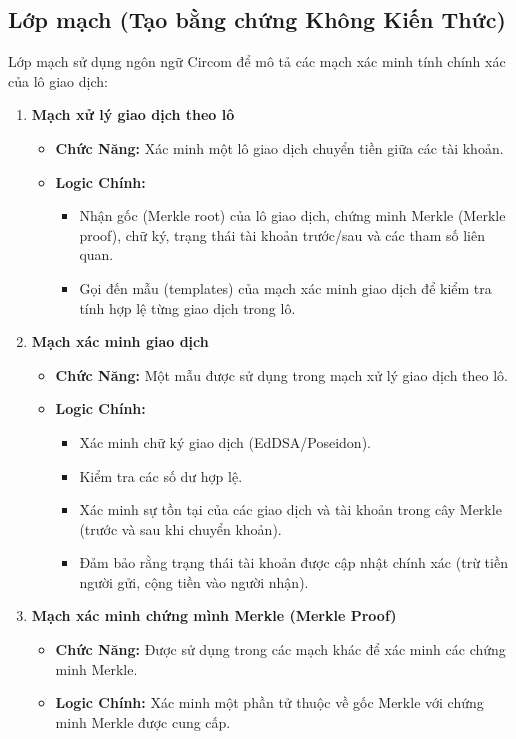 \subsection{Lớp mạch (Tạo bằng chứng Không Kiến Thức)}
Lớp mạch sử dụng ngôn ngữ Circom để mô tả các mạch xác minh tính chính xác của lô giao dịch:
\begin{enumerate}

\item \textbf{Mạch xử lý giao dịch theo lô}
\begin{itemize}
    \item \textbf{Chức Năng:} Xác minh một lô giao dịch chuyển tiền giữa các tài khoản.
    \item \textbf{Logic Chính:}
    \begin{itemize}
        \item Nhận gốc (Merkle root) của lô giao dịch, chứng minh Merkle (Merkle proof), chữ ký, trạng thái tài khoản trước/sau và các tham số liên quan.
        \item Gọi đến mẫu (templates) của mạch xác minh giao dịch để kiểm tra tính hợp lệ từng giao dịch trong lô.
    \end{itemize}
\end{itemize}

\item \textbf{Mạch xác minh giao dịch}
\begin{itemize}
    \item \textbf{Chức Năng:} Một mẫu được sử dụng trong mạch xử lý giao dịch theo lô.
    \item \textbf{Logic Chính:}
    \begin{itemize}
        \item Xác minh chữ ký giao dịch (EdDSA/Poseidon).
        \item Kiểm tra các số dư hợp lệ.
        \item Xác minh sự tồn tại của các giao dịch và tài khoản trong cây Merkle (trước và sau khi chuyển khoản).
        \item Đảm bảo rằng trạng thái tài khoản được cập nhật chính xác (trừ tiền người gửi, cộng tiền vào người nhận).
    \end{itemize}
\end{itemize}

\item \textbf{Mạch xác minh chứng mình Merkle (Merkle Proof)}
\begin{itemize}
    \item \textbf{Chức Năng:} Được sử dụng trong các mạch khác để xác minh các chứng minh Merkle.
    \item \textbf{Logic Chính:} Xác minh một phần tử thuộc về gốc Merkle với chứng minh Merkle được cung cấp.
\end{itemize}


\end{enumerate}

